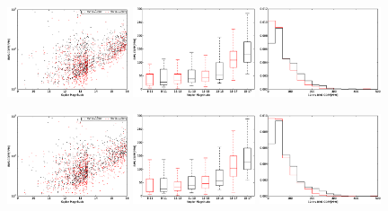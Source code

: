 \documentclass[12pt, preprint]{aastex}
\begin{document}
\begin{figure}[p]
\begin{center}
\includegraphics[width=0.32\textwidth]{f6a}
\includegraphics[width=0.32\textwidth]{f6b}
\includegraphics[width=0.32\textwidth]{f6c}

\includegraphics[width=0.32\textwidth]{f6d}
\includegraphics[width=0.32\textwidth]{f6e}
\includegraphics[width=0.32\textwidth]{f6f}


\end{center}
\end{figure}
\end{document}
